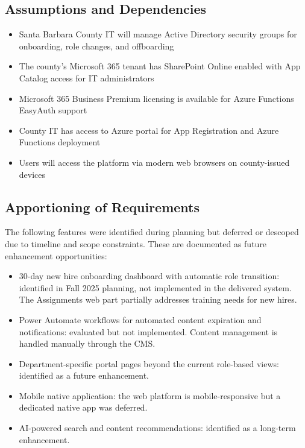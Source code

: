 \documentclass[12pt]{article}
\begin{document}
\subsection{Assumptions and Dependencies}

\begin{itemize}[leftmargin=*]
\item  Santa Barbara County IT will manage Active Directory security groups for onboarding, role changes, and offboarding
\item  The county's Microsoft 365 tenant has SharePoint Online enabled with App Catalog access for IT administrators
\item  Microsoft 365 Business Premium licensing is available for Azure Functions EasyAuth support
\item  County IT has access to Azure portal for App Registration and Azure Functions deployment
\item  Users will access the platform via modern web browsers on county-issued devices
\end{itemize}

\subsection{Apportioning of Requirements}

The following features were identified during planning but deferred or descoped due to timeline and scope constraints. These are documented as future enhancement opportunities:

\begin{itemize}[leftmargin=*]
\item  30-day new hire onboarding dashboard with automatic role transition: identified in Fall 2025 planning, not implemented in the delivered system. The Assignments web part partially addresses training needs for new hires.
\item  Power Automate workflows for automated content expiration and notifications: evaluated but not implemented. Content management is handled manually through the CMS.
\item  Department-specific portal pages beyond the current role-based views: identified as a future enhancement.
\item  Mobile native application: the web platform is mobile-responsive but a dedicated native app was deferred.
\item  AI-powered search and content recommendations: identified as a long-term enhancement.
\end{itemize}
\end{document}
